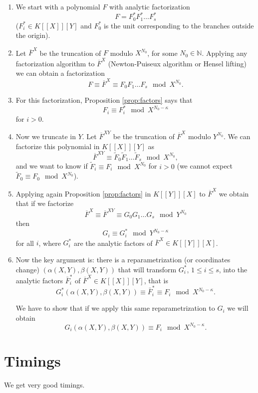 \documentclass[a4paper,11pt]{amsart}%
\theoremstyle{definition}
\theoremstyle{plain}
\theoremstyle{remark}
\newcommand{\N}{{\mathbb N}}
\newcommand\ct[1]{\text{\rmfamily\upshape #1}}
\newcommand{\IntExpX}{\ct{IntExp}_X}
\newcommand{\IntExpY}{\ct{IntExp}_Y}
\begin{document}
\begin{enumerate}
\item We start with a polynomial $F$ with analytic factorization
$$
F = F_0^* F_1^* \dots F_s^*$$
($F_i^* \in K[[X]][Y]$ and $F_0^*$ is the unit corresponding to the branches outside the origin).

\item Let $\overline{F}^X$ be the truncation of $F$ modulo $X^{N_0}$, for some $N_0 \in \N$. Applying any factorization algorithm to $\overline{F}^X$ (Newton-Puiseux algorithm or Hensel lifting) we can obtain a factorization
$$
F \equiv \overline{F}^X \equiv  F_0 F_1 \dots F_s \mod X^{N_0}.
$$


\item For this factorization, Proposition \ref{prop:factors} says that 
$$F_i \equiv F_i^* \mod X^{N_0 - \kappa}$$
for $i > 0$.

\item Now we truncate in $Y$. Let $\overline{F}^{XY}$ be the truncation of $\overline{F}^X$ modulo $Y^{N_0}$. We can factorize this polynomial in $K[[X]][Y]$ as
$$
\overline{F}^{XY} \equiv  \tilde{F}_0 \tilde{F}_1 \dots \tilde{F}_s \mod X^{N_0},
$$
and we want to know if $\tilde{F}_i \equiv F_i \mod X^{N_0}$ for $i > 0$ (we cannot expect $\tilde{F}_0 \equiv F_0 \mod X^{N_0}$).

\item Applying again Proposition \ref{prop:factors} in $K[[Y]][X]$ to $\overline{F}^X$ we obtain that if we factorize
$$
\overline{F}^{X} \equiv \overline{F}^{XY} \equiv  G_0 G_1 \dots G_s \mod Y^{N_0}
$$
then 
$$G_i \equiv G_i^* \mod Y^{N_0 - \kappa}$$
for all $i$, where $G_i^*$ are the analytic factors of $\overline{F}^{X} \in K[[Y]][X]$.

\item Now the key argument is: there is a reparametrization (or coordinates change) $(\alpha(X,Y), \beta(X,Y))$ that will transform $G_i^*$, $1 \le i \le s$, into the analytic factors $\bar F_i^*$ of $\overline{F}^{X} \in K[[X]][Y]$, that is
$$    
G_i^*(\alpha(X,Y), \beta(X,Y)) \equiv \bar F_i^* \equiv F_i \mod X^{N_0-\kappa}.
$$
    
We have to show that if we apply this same reparametrization to $G_i$ we will obtain
$$G_i(\alpha(X,Y), \beta(X,Y)) \equiv F_i \mod X^{N_0 - \kappa}.$$
\end{enumerate}



%


\section{Timings}

We get very good timings.



\end{document}
